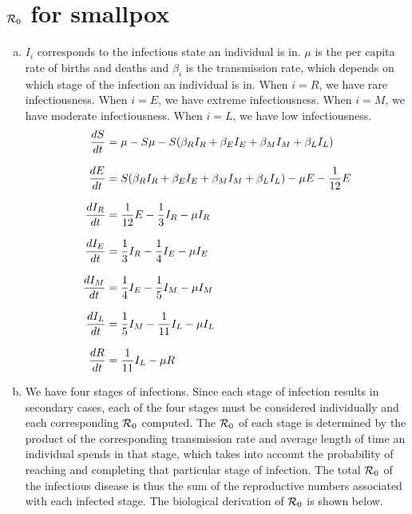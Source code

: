 \documentclass[12pt]{article}\usepackage[]{graphicx}\usepackage[]{color}
\begin{document}
\section{${\cal R}_0$ for smallpox}

\begin{enumerate}[(a)]

\item

$I_i$ corresponds to the infectious state an individual is in. $\mu$ is the per capita rate of births and deaths and $\beta_i$ is the transmission rate, which depends on which stage of the infection an individual is in. When $i=R$, we have rare infectiousness. When $i=E$, we have extreme infectiousness. When $i=M$, we have moderate infectiousness. When $i=L$, we have low infectiousness. 
\begin{subequations}
\begin{align}
\frac{dS}{dt} &= \mu - S \mu - S (\beta_R I _R + \beta_E I _E + \beta_M I_M + \beta_L I_L) \\
\noalign{\vspace{8pt}}
\frac{dE}{dt} &= S (\beta_R I _R + \beta_E I _E + \beta_M I_M + \beta_L I_L) - \mu E - \frac{1}{12} E \\
\noalign{\vspace{8pt}}
\frac{dI_R}{dt} &= \frac{1}{12} E - \frac{1}{3} I_R - \mu I_R \\
\noalign{\vspace{8pt}}
\frac{dI_E}{dt} &= \frac{1}{3} I_R - \frac{1}{4} I_E - \mu I_E \\
\noalign{\vspace{8pt}}
\frac{dI_M}{dt} &= \frac{1}{4} I_E - \frac{1}{5} I_M - \mu I_M \\
\noalign{\vspace{8pt}}
\frac{dI_L}{dt} &= \frac{1}{5} I_M - \frac{1}{11} I_L - \mu I_L \\
\noalign{\vspace{8pt}}
\frac{dR}{dt} &= \frac{1}{11} I_L - \mu R
\end{align}
\end{subequations}

  \item

We have four stages of infections. 
Since each stage of infection results in secondary cases, each of the four stages must be considered individually and each corresponding ${\cal R}_0$ computed. The ${\cal R}_0$ of each stage is determined by the product of the corresponding transmission rate and average length of time an individual spends in that stage, which takes into account the probability of reaching and completing that particular stage of infection. The total ${\cal R}_0$ of the infectious disease is thus the sum of the reproductive numbers associated with each infected stage. The biological derivation of ${\cal R}_0$ is shown below.


\end{enumerate}
\end{document}
